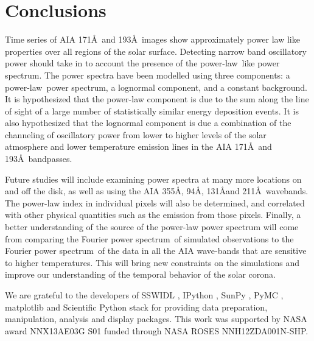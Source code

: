 \documentclass{aastex}
\newcommand{\PS}{power spectrum}
\newcommand{\PL}{power-law}
\newcommand{\Fps}{Fourier \PS}
\begin{document}
\section{Conclusions}\label{sec:conc}

Time series of AIA 171\AA\ and 193\AA\ images show approximately power
law like properties over all regions of the solar surface.  Detecting
narrow band oscillatory power should take in to account the presence
of the \PL\ like \PS.  The power spectra have been modelled using
three components: a \PL\ \PS, a lognormal component, and a constant
background.  It is hypothesized that the power-law component is due to
the sum along the line of sight of a large number of statistically
similar energy deposition events.  It is also hypothesized that the
lognormal component is due a combination of the channeling of
oscillatory power from lower to higher levels of the solar atmosphere
and lower temperature emission lines in the AIA 171\AA\ and
193\AA\ bandpasses.

Future studies will include examining power spectra at many more
locations on and off the disk, as well as using the AIA 355\AA, 94\AA,
131\AA and 211\AA\ wavebands.  The power-law index in individual
pixels will also be determined, and correlated with other physical
quantities such as the emission from those pixels.  Finally, a better
understanding of the source of the power-law power spectrum will come
from comparing the \Fps\ of simulated observations to the \Fps\ of the
data in all the AIA wave-bands that are sensitive to higher
temperatures.  This will bring new constraints on the simulations and
improve our understanding of the temporal behavior of the solar
corona.




\acknowledgments

We are grateful to the developers of SSWIDL
\citep{1998SoPh..182..497F}, IPython \citep{ipython}, SunPy
\citep{mumford-proc-scipy-2013}, PyMC
\citep{Patil:Huard:Fonnesbeck:2010:JSSOBK:v35i04}, matplotlib
\citep{Hunter:2007} and Scientific Python stack for providing data
preparation, manipulation, analysis and display packages.  This work
was supported by NASA award NNX13AE03G S01 funded through NASA ROSES
NNH12ZDA001N-SHP.
\end{document}
